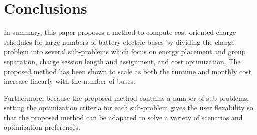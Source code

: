 \section{Conclusions}
In summary, this paper proposes a method to compute cost-oriented charge schedules for large numbers of battery electric buses by dividing the charge problem into several sub-problems which focus on energy placement and group separation, charge session length and assignment, and cost optimization. The proposed method has been shown to scale as both the runtime and monthly cost increase linearly with the number of buses. 
\par Furthermore, because the proposed method contains a number of sub-problems, setting the optimization criteria for each sub-problem gives the user flexability so that the proposed method can be adapated to solve a variety of scenarios and optimization preferences.
